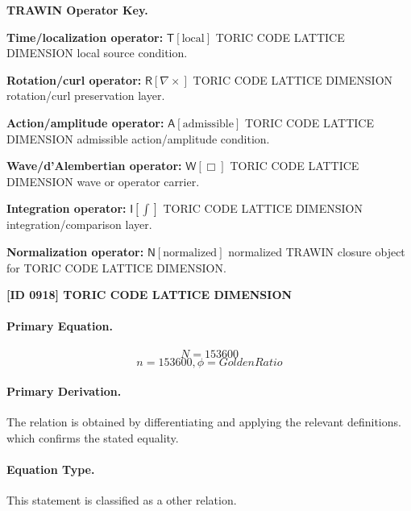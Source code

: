 \par\vspace{0.45\baselineskip}
\noindent\begin{minipage}[t]{\linewidth}
\begingroup
\small
\raggedright
\textbf{TRAWIN Operator Key.}\par
\noindent\textbf{Time/localization operator:} $\mathsf{T}\!\left[\mathrm{local}\right]$ TORIC CODE LATTICE DIMENSION local source condition.\par
\noindent\textbf{Rotation/curl operator:} $\mathsf{R}\!\left[\nabla\times\right]$ TORIC CODE LATTICE DIMENSION rotation/curl preservation layer.\par
\noindent\textbf{Action/amplitude operator:} $\mathsf{A}\!\left[\mathrm{admissible}\right]$ TORIC CODE LATTICE DIMENSION admissible action/amplitude condition.\par
\noindent\textbf{Wave/d'Alembertian operator:} $\mathsf{W}\!\left[\Box\right]$ TORIC CODE LATTICE DIMENSION wave or operator carrier.\par
\noindent\textbf{Integration operator:} $\mathsf{I}\!\left[\int\right]$ TORIC CODE LATTICE DIMENSION integration/comparison layer.\par
\noindent\textbf{Normalization operator:} $\mathsf{N}\!\left[\mathrm{normalized}\right]$ normalized TRAWIN closure object for TORIC CODE LATTICE DIMENSION.\par
\endgroup
\end{minipage}

\clearpage
\noindent\textbf{[ID 0918] TORIC CODE LATTICE DIMENSION}\par
\vspace{0.35em}
\paragraph{Primary Equation.}
\[
N=153600
\]
\[
{n = 153600, \phi = GoldenRatio}
\]

\paragraph{Primary Derivation.}
The relation is obtained by differentiating and applying the relevant definitions. which confirms the stated equality.
\paragraph{Equation Type.}
This statement is classified as a other relation.

